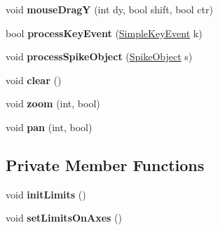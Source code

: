 \begin{DoxyCompactItemize}
\item 
\hypertarget{classTetrodePlot_a3e14ad4c305364e1b935fe0574457735}{void {\bfseries mouse\-Drag\-Y} (int dy, bool shift, bool ctr)}\label{classTetrodePlot_a3e14ad4c305364e1b935fe0574457735}

\item 
\hypertarget{classTetrodePlot_aed9d207dbb3f6b08aeaf71232fbbbbd5}{bool {\bfseries process\-Key\-Event} (\hyperlink{structSimpleKeyEvent}{Simple\-Key\-Event} k)}\label{classTetrodePlot_aed9d207dbb3f6b08aeaf71232fbbbbd5}

\item 
\hypertarget{classTetrodePlot_abdd11b1351085b0398944fdfa514b747}{void {\bfseries process\-Spike\-Object} (\hyperlink{structSpikeObject}{Spike\-Object} s)}\label{classTetrodePlot_abdd11b1351085b0398944fdfa514b747}

\item 
\hypertarget{classTetrodePlot_a5135b3a4b280524ce48fa2167c266cd6}{void {\bfseries clear} ()}\label{classTetrodePlot_a5135b3a4b280524ce48fa2167c266cd6}

\item 
\hypertarget{classTetrodePlot_a86363d2346402271e993b31bcfde43fd}{void {\bfseries zoom} (int, bool)}\label{classTetrodePlot_a86363d2346402271e993b31bcfde43fd}

\item 
\hypertarget{classTetrodePlot_aed977b68cd1b2cfd2e155d58ec6f25da}{void {\bfseries pan} (int, bool)}\label{classTetrodePlot_aed977b68cd1b2cfd2e155d58ec6f25da}

\end{DoxyCompactItemize}
\subsection*{Private Member Functions}
\begin{DoxyCompactItemize}
\item 
\hypertarget{classTetrodePlot_a6ac2b954365575b90c3b4ea09bca05cb}{void {\bfseries init\-Limits} ()}\label{classTetrodePlot_a6ac2b954365575b90c3b4ea09bca05cb}

\item 
\hypertarget{classTetrodePlot_a6c55a9182b40a5f81e5c6ed13d3f9512}{void {\bfseries set\-Limits\-On\-Axes} ()}\label{classTetrodePlot_a6c55a9182b40a5f81e5c6ed13d3f9512}

\end{DoxyCompactItemize}
